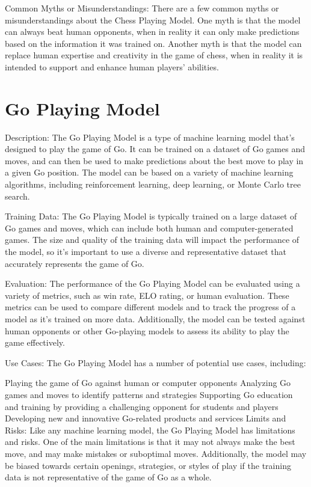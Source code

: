 Common Myths or Misunderstandings:
There are a few common myths or misunderstandings about the Chess Playing Model. One myth is that the model can always beat human opponents, when in reality it can only make predictions based on the information it was trained on. Another myth is that the model can replace human expertise and creativity in the game of chess, when in reality it is intended to support and enhance human players' abilities.

\section{Go Playing Model}

Description:
The Go Playing Model is a type of machine learning model that's designed to play the game of Go. It can be trained on a dataset of Go games and moves, and can then be used to make predictions about the best move to play in a given Go position. The model can be based on a variety of machine learning algorithms, including reinforcement learning, deep learning, or Monte Carlo tree search.

Training Data:
The Go Playing Model is typically trained on a large dataset of Go games and moves, which can include both human and computer-generated games. The size and quality of the training data will impact the performance of the model, so it's important to use a diverse and representative dataset that accurately represents the game of Go.

Evaluation:
The performance of the Go Playing Model can be evaluated using a variety of metrics, such as win rate, ELO rating, or human evaluation. These metrics can be used to compare different models and to track the progress of a model as it's trained on more data. Additionally, the model can be tested against human opponents or other Go-playing models to assess its ability to play the game effectively.

Use Cases:
The Go Playing Model has a number of potential use cases, including:

Playing the game of Go against human or computer opponents
Analyzing Go games and moves to identify patterns and strategies
Supporting Go education and training by providing a challenging opponent for students and players
Developing new and innovative Go-related products and services
Limits and Risks:
Like any machine learning model, the Go Playing Model has limitations and risks. One of the main limitations is that it may not always make the best move, and may make mistakes or suboptimal moves. Additionally, the model may be biased towards certain openings, strategies, or styles of play if the training data is not representative of the game of Go as a whole.

